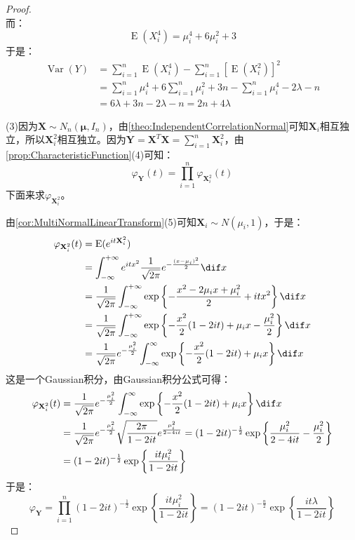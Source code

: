 \begin{proof}
\begin{equation*}
	\end{equation*}
	而：
	\begin{equation*}
		\operatorname{E}(X_i^4)=\mu_i^4+6\mu_i^2+3
	\end{equation*}
	于是：
	\begin{align*}
		\operatorname{Var}(Y)
		&=\sum_{i=1}^{n}\operatorname{E}(X_i^4)-\sum_{i=1}^{n}[\operatorname{E}(X_i^2)]^2 \\
		&=\sum_{i=1}^{n}\mu_i^4+6\sum_{i=1}^{n}\mu_i^2+3n-\sum_{i=1}^{n}\mu_i^4-2\lambda-n \\
		&=6\lambda+3n-2\lambda-n=2n+4\lambda
	\end{align*}\par
	(3)因为$\mathbf{X}\sim N_n(\boldsymbol{\mu},I_n)$，由\cref{theo:IndependentCorrelationNormal}可知$\mathbf{X}_i$相互独立，所以$\mathbf{X}_i^2$相互独立。因为$\mathbf{Y}=\mathbf{X}^T\mathbf{X}=\sum\limits_{i=1}^n\mathbf{X}_i^2$，由\cref{prop:CharacteristicFunction}(4)可知：
	\begin{equation*}
		\varphi_{\mathbf{Y}}(t)=\prod_{i=1}^n\varphi_{\mathbf{X}_i^2}(t)
	\end{equation*}
	下面来求$\varphi_{\mathbf{X}_i^2}$。\par
	由\cref{cor:MultiNormalLinearTransform}(5)可知$\mathbf{X}_i\sim N(\mu_i,1)$，于是：
	\begin{align*}
		\varphi_{\mathbf{X}_i^2}(t)
		&=\operatorname{E}(e^{it\mathbf{X}_i^2}) \\
		&=\int_{-\infty}^{+\infty}e^{itx^2}\frac{1}{\sqrt{2\pi}}e^{-\frac{(x-\mu_i)^2}{2}}\dif x \\
		&=\frac{1}{\sqrt{2\pi}}\int_{-\infty}^{+\infty}\exp\left\{-\frac{x^2 - 2\mu_ix + \mu_i^2}{2} + itx^2\right\}\dif x \\
		&=\frac{1}{\sqrt{2\pi}}\int_{-\infty}^{+\infty}\exp\left\{-\frac{x^2}{2} (1 - 2it) + \mu_ix - \frac{\mu_i^2}{2}\right\}\dif x \\
		&=\frac{1}{\sqrt{2\pi}}e^{-\frac{\mu_i^2}{2}} \int_{-\infty}^{\infty} \exp\left\{-\frac{x^2}{2} (1 - 2it) + \mu_ix\right\}\dif x
	\end{align*}
	这是一个Gaussian积分，由Gaussian积分公式可得：
	\begin{align*}
		\varphi_{\mathbf{X}_i^2}(t)
		&=\frac{1}{\sqrt{2\pi}}e^{-\frac{\mu_i^2}{2}} \int_{-\infty}^{\infty}\exp\left\{-\frac{x^2}{2} (1 - 2it) + \mu_i x\right\}\dif x \\
		&=\frac{1}{\sqrt{2\pi}}e^{-\frac{\mu_i^2}{2}}\sqrt{\frac{2\pi}{1-2it}}e^{\frac{\mu_i^2}{2-4it}}
		=(1-2it)^{-\frac{1}{2}}\exp\left\{\frac{\mu_i^2}{2-4it}-\frac{\mu_i^2}{2}\right\} \\
		&=(1-2it)^{-\frac{1}{2}}\exp\left\{\frac{it\mu_i^2}{1-2it}\right\}
	\end{align*}
	于是：
	\begin{equation*}
		\varphi_{\mathbf{Y}}=\prod_{i=1}^n(1-2it)^{-\frac{1}{2}}\exp\left\{\frac{it\mu_i^2}{1-2it}\right\}=(1-2it)^{-\frac{n}{2}}\exp\left\{\frac{it\lambda}{1-2it}\right\}
	\end{equation*}
\end{proof}

